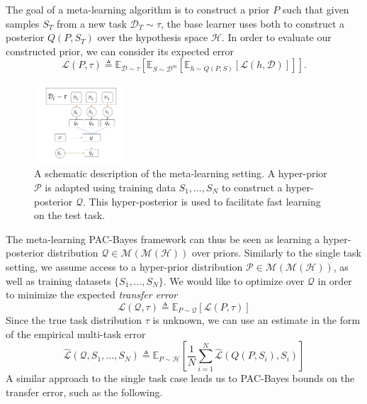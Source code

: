 \documentclass[letterpaper]{article} %
\theoremstyle{definition}
\newcommand{\Expect}[2]{\mathbb{E}_{#1}\left [#2 \right ]}
\begin{document}
The goal of a meta-learning algorithm is to construct a prior $P$ such that given samples $S_T$ from a new task $\mathcal{D}_T\sim \tau$, the base learner uses both to construct a posterior $Q(P, S_T)$ over the hypothesis space $\mathcal{H}$. In order to evaluate our constructed prior, we can consider its expected error
%
\begin{equation}
\mathcal{L}(P, \tau)\triangleq \Expect{\mathcal{D}\sim \tau}{\Expect{S\sim \mathcal{D}^m}{\Expect{h\sim Q(P, S)}{\mathcal{L}(h, \mathcal{D})}}} .
\end{equation}
%
\begin{figure}[t]
	\centering
	\includegraphics[width=0.3\textwidth]{setup_ml.PNG}
	\caption{A schematic description of the meta-learning setting. A hyper-prior $\mathcal{P}$ is adapted using training data $S_1,\ldots,S_N$ to construct a hyper-posterior $\mathcal{Q}$. This hyper-posterior is used to facilitate fast learning on the test task.}
	\label{fig:meta-learning-setting}
\end{figure}
%
The meta-learning PAC-Bayes framework can thus be seen as learning a hyper-posterior distribution $\mathcal{Q}\in \mathcal{M}(\mathcal{M}(\mathcal{H}))$ over priors. Similarly to the single task setting, we assume access to a hyper-prior distribution $\mathcal{P}\in \mathcal{M}(\mathcal{M}(\mathcal{H}))$, as well as training datasets $\{S_1,...,S_N\}$.
We would like to optimize over $\mathcal{Q}$ in order to minimize the expected \emph{transfer error} 
$$
\mathcal{L}(\mathcal{Q}, \tau) \triangleq \Expect{P\sim \mathcal{Q}}{\mathcal{L}(P, \tau)}
$$
Since the true task distribution $\tau$ is unknown, we can use an estimate in the form of the empirical multi-task error $$\hat{\mathcal{L}}(\mathcal{Q}, S_1,...,S_N)\triangleq \Expect{P\sim \mathcal{H}}{\frac{1}{N}\sum_{i=1}^{N}\hat{\mathcal{L}}(Q(P, S_i), S_i)}$$
A similar approach to the single task case leads us to PAC-Bayes bounds on the transfer error, such as the following.
\end{document}
